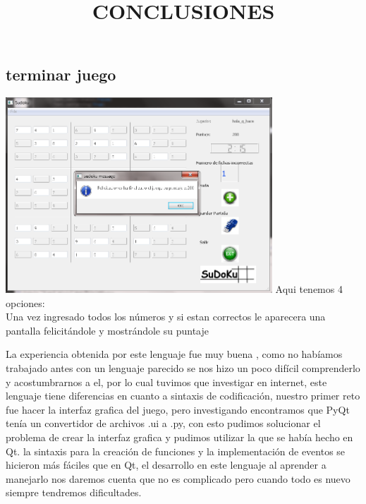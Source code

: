\documentclass[12pt]{extbook}
\begin{document}
\begin{center}
\section{terminar juego}
\end{center}
\begin{center}
\includegraphics[width=10cm]{felicitaciones.png}
Aqui tenemos 4 opciones:\\
Una vez ingresado todos los números y si estan correctos le aparecera una pantalla felicitándole y mostrándole su puntaje 
\end{center}





\begin{center}
\title{CONCLUSIONES}\maketitle
\end{center}

La experiencia obtenida por este lenguaje  fue muy buena , como no habíamos trabajado antes con un lenguaje parecido se nos hizo un poco difícil comprenderlo y acostumbrarnos a el, por lo cual tuvimos que investigar en internet, este lenguaje tiene diferencias en cuanto a sintaxis de codificación, nuestro primer reto fue hacer la interfaz grafica del juego, pero investigando encontramos que PyQt tenía un convertidor de archivos .ui a .py, con esto pudimos solucionar el problema de crear la interfaz grafica y pudimos utilizar la que se había hecho en Qt.
la sintaxis para la creación de funciones y la implementación de eventos se hicieron más fáciles que en Qt, el desarrollo en este lenguaje al aprender a manejarlo nos daremos cuenta que no es complicado pero cuando todo es nuevo siempre tendremos dificultades.
\end{document}
